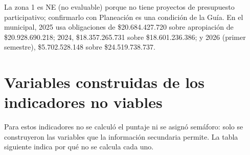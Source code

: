 \documentclass[11pt,letterpaper]{article}
\begin{document}
La zona 1 es NE (no evaluable) porque no tiene proyectos de presupuesto participativo; confirmarlo con Planeación es una condición de la Guía. En el municipal, 2025 usa obligaciones de \$20.684.427.720 sobre apropiación de \$20.928.690.218; 2024, \$18.357.265.731 sobre \$18.601.236.386; y 2026 (primer semestre), \$5.702.528.148 sobre \$24.519.738.737.

\section{Variables construidas de los indicadores no viables}

Para estos indicadores no se calculó el puntaje ni se asignó semáforo: solo se construyeron las variables que la información secundaria permite. La tabla siguiente indica por qué no se calcula cada uno.
\end{document}
